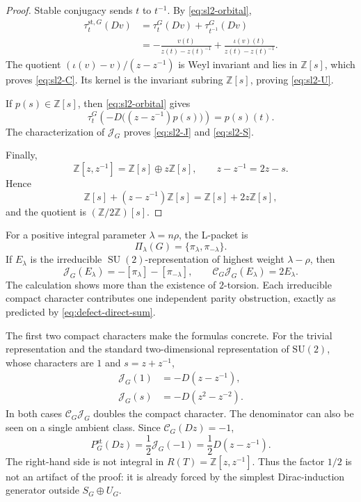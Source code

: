 \documentclass[11pt]{amsart}
\theoremstyle{definition}
\theoremstyle{remark}
\newcommand{\Z}{\mathbb Z}
\newcommand{\st}{\mathrm{st}}
\newcommand{\SU}{\operatorname{SU}}
\begin{document}
\begin{proof}
Stable conjugacy sends $t$ to $t^{-1}$.  By \eqref{eq:sl2-orbital},
\begin{align*}
  \tau_t^{\st,G}(Dv)
  &=\tau_t^G(Dv)+\tau_{t^{-1}}^G(Dv)\\
  &=-\frac{v(t)}{z(t)-z(t)^{-1}}
    +\frac{\iota(v)(t)}{z(t)-z(t)^{-1}}.
\end{align*}
The quotient $(\iota(v)-v)/(z-z^{-1})$ is Weyl invariant and lies in $\Z[s]$, which proves \eqref{eq:sl2-C}.  Its kernel is the invariant subring $\Z[s]$, proving \eqref{eq:sl2-U}.

If $p(s)\in\Z[s]$, then \eqref{eq:sl2-orbital} gives
\[
  \tau_t^G\left(-D\bigl((z-z^{-1})p(s)\bigr)\right)=p(s)(t).
\]
The characterization of $\mathcal J_G$ proves \eqref{eq:sl2-J} and \eqref{eq:sl2-S}.

Finally,
\[
  \Z[z,z^{-1}]=\Z[s]\oplus z\Z[s],
  \qquad z-z^{-1}=2z-s.
\]
Hence
\[
  \Z[s]+(z-z^{-1})\Z[s]
  =\Z[s]+2z\Z[s],
\]
and the quotient is $(\Z/2\Z)[s]$.
\end{proof}

For a positive integral parameter $\lambda=n\rho$, the L-packet is
\[
  \Pi_\lambda(G)=\{\pi_\lambda,\pi_{-\lambda}\}.
\]
If $E_\lambda$ is the irreducible $\SU(2)$-representation of highest weight $\lambda-\rho$, then
\begin{equation}\label{eq:sl2-packet}
  \mathcal J_G(E_\lambda)
  =-[\pi_\lambda]-[\pi_{-\lambda}],
  \qquad
  \mathcal C_G\mathcal J_G(E_\lambda)=2E_\lambda.
\end{equation}
The calculation shows more than the existence of \(2\)-torsion.  Each irreducible compact character contributes one independent parity obstruction, exactly as predicted by \eqref{eq:defect-direct-sum}.

The first two compact characters make the formulas concrete.  For the trivial
representation and the standard two-dimensional representation of
\(\mathrm{SU}(2)\), whose characters are \(1\) and \(s=z+z^{-1}\),
\begin{align*}
  \mathcal J_G(1)&=-D(z-z^{-1}),\\
  \mathcal J_G(s)&=-D(z^2-z^{-2}).
\end{align*}
In both cases \(\mathcal C_G\mathcal J_G\) doubles the compact character.
The denominator can also be seen on a single ambient class.  Since
\(\mathcal C_G(Dz)=-1\),
\begin{equation}\label{eq:sl2-half-projector}
  P_G^{\mathrm{st}}(Dz)
  =\frac12\mathcal J_G(-1)
  =\frac12D(z-z^{-1}).
\end{equation}
The right-hand side is not integral in \(R(T)=\mathbb Z[z,z^{-1}]\).  Thus the
factor \(1/2\) is not an artifact of the proof: it is already forced by the
simplest Dirac-induction generator outside \(S_G\oplus U_G\).
\end{document}
